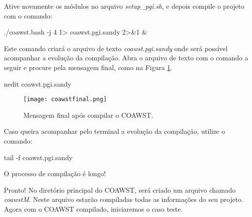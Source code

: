 \noindent Ative novamente os módulos no arquivo \textit{setup\_pgi.sh}, e depois compile o projeto com o comando:
\bigskip

\begin{bashcode}
./coawst.bash -j 4  1> coawst.pgi.sandy 2>&1 &
\end{bashcode}
\bigskip

\noindent Este comando criará o arquivo de texto \textit{coawst.pgi.sandy} onde será possível acompanhar a evolução da compilação. Abra o arquivo de texto com o comando a seguir e procure pela mensagem final, como na Figura \textcolor{bleu_cite}{\ref{compcoafinal}}.
\bigskip

\begin{bashcode}
nedit coawst.pgi.sandy
\end{bashcode}
\bigskip

\begin{figure}[H]
    \centering
    \texttt{[image: coawstfinal.png]}
    \caption{Mensagem final após compilar o COAWST.}
    \label{compcoafinal}
\end{figure}
\bigskip

\noindent Caso queira acompanhar pelo terminal a evolução da compilação, utilize o comando:
\bigskip

\begin{bashcode}
tail -f coawst.pgi.sandy
\end{bashcode}
\bigskip

\begin{tcolorbox}[enhanced,
  grow to left by=0cm,%
  grow to right by=0cm,%
  enlarge top by=0cm,%
  enlarge bottom by=0cm,%
  tcbox raise base,
  boxrule=1.0pt,
  left=18mm,
  colframe=red!50!black,coltext=red!25!black,colback=red!10!white,
  overlay={\begin{tcbclipinterior}\fill[red!75!blue!50!white] (frame.south west)
    rectangle node[text=white,font=\sffamily\bfseries\footnotesize,rotate=0] {ATENÇÃO} ([xshift=18mm]frame.north west);\end{tcbclipinterior}}]
O processo de compilação é longo!
\end{tcolorbox}
\bigskip


\noindent Pronto! No diretório principal do COAWST, será criado um arquivo chamado \textit{coawstM}. Neste arquivo estarão compiladas todas as informações do seu projeto. Agora com o COAWST compilado, iniciaremos o caso teste.
\bigskip

